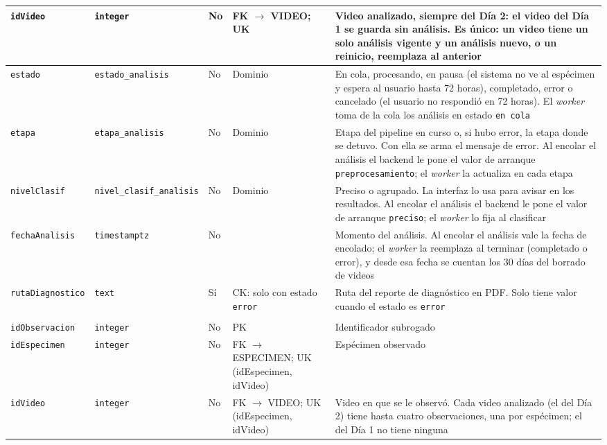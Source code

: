 {\begin{longtable}{|>{\raggedright}p{3.7cm}|>{\raggedright}p{2.3cm}|>{\centering}p{0.9cm}|>{\raggedright}p{2.3cm}|>{\raggedright\arraybackslash}p{4.2cm}|}
\hline
\texttt{idVideo} & \texttt{integer} & No & FK $\to$ VIDEO; UK & Video analizado, siempre del Día 2: el video del Día 1 se guarda sin análisis. Es único: un video tiene un solo análisis vigente y un análisis nuevo, o un reinicio, reemplaza al anterior \\
\hline
\texttt{estado} & \texttt{estado\_\allowbreak{}analisis} & No & Dominio & En cola, procesando, en pausa (el sistema no ve al espécimen y espera al usuario hasta 72 horas), completado, error o cancelado (el usuario no respondió en 72 horas). El \textit{worker} toma de la cola los análisis en estado \texttt{en cola} \\
\hline
\texttt{etapa} & \texttt{etapa\_\allowbreak{}analisis} & No & Dominio & Etapa del pipeline en curso o, si hubo error, la etapa donde se detuvo. Con ella se arma el mensaje de error. Al encolar el análisis el backend le pone el valor de arranque \texttt{preprocesamiento}; el \textit{worker} la actualiza en cada etapa \\
\hline
\texttt{nivelClasif} & \texttt{nivel\_\allowbreak{}clasif\_\allowbreak{}analisis} & No & Dominio & Preciso o agrupado. La interfaz lo usa para avisar en los resultados. Al encolar el análisis el backend le pone el valor de arranque \texttt{preciso}; el \textit{worker} lo fija al clasificar \\
\hline
\texttt{fechaAnalisis} & \texttt{timestamptz} & No & & Momento del análisis. Al encolar el análisis vale la fecha de encolado; el \textit{worker} la reemplaza al terminar (completado o error), y desde esa fecha se cuentan los 30 días del borrado de videos \\
\hline
\texttt{rutaDiagnostico} & \texttt{text} & Sí & CK: solo con estado \texttt{error} & Ruta del reporte de diagnóstico en PDF. Solo tiene valor cuando el estado es \texttt{error} \\
\hline
\multicolumn{5}{|l|}{\cellcolor{gray!15}\textbf{OBSERVACION}: un espécimen dentro de un video} \\
\hline
\texttt{idObservacion} & \texttt{integer} & No & PK & Identificador subrogado \\
\hline
\texttt{idEspecimen} & \texttt{integer} & No & FK $\to$ ESPECIMEN; UK (idEspecimen, idVideo) & Espécimen observado \\
\hline
\texttt{idVideo} & \texttt{integer} & No & FK $\to$ VIDEO; UK (idEspecimen, idVideo) & Video en que se le observó. Cada video analizado (el del Día 2) tiene hasta cuatro observaciones, una por espécimen; el del Día 1 no tiene ninguna \\

\end{longtable}}
